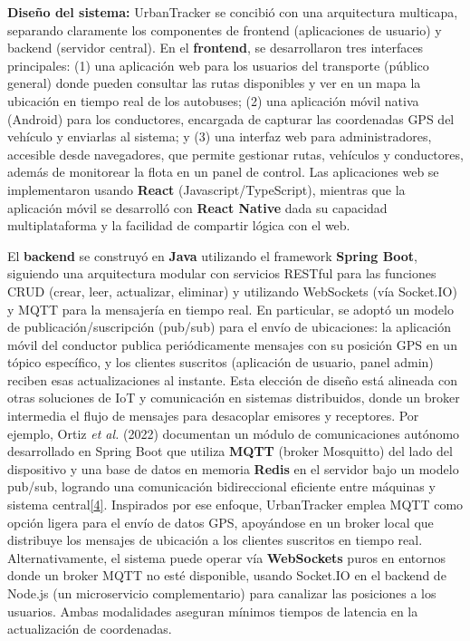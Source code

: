 \textbf{Diseño del sistema:} UrbanTracker se concibió con una arquitectura multicapa, separando claramente los componentes de frontend (aplicaciones de usuario) y backend (servidor central). En el \textbf{frontend}, se desarrollaron tres interfaces principales: (1) una aplicación web para los usuarios del transporte (público general) donde pueden consultar las rutas disponibles y ver en un mapa la ubicación en tiempo real de los autobuses; (2) una aplicación móvil nativa (Android) para los conductores, encargada de capturar las coordenadas GPS del vehículo y enviarlas al sistema; y (3) una interfaz web para administradores, accesible desde navegadores, que permite gestionar rutas, vehículos y conductores, además de monitorear la flota en un panel de control. Las aplicaciones web se implementaron usando \textbf{React} (Javascript/TypeScript), mientras que la aplicación móvil se desarrolló con \textbf{React Native} dada su capacidad multiplataforma y la facilidad de compartir lógica con el web.

El \textbf{backend} se construyó en \textbf{Java} utilizando el framework \textbf{Spring Boot}, siguiendo una arquitectura modular con servicios RESTful para las funciones CRUD (crear, leer, actualizar, eliminar) y utilizando WebSockets (vía Socket.IO) y MQTT para la mensajería en tiempo real. En particular, se adoptó un modelo de publicación/suscripción (pub/sub) para el envío de ubicaciones: la aplicación móvil del conductor publica periódicamente mensajes con su posición GPS en un tópico específico, y los clientes suscritos (aplicación de usuario, panel admin) reciben esas actualizaciones al instante. Esta elección de diseño está alineada con otras soluciones de IoT y comunicación en sistemas distribuidos, donde un broker intermedia el flujo de mensajes para desacoplar emisores y receptores. Por ejemplo, Ortiz \emph{et al.} (2022) documentan un módulo de comunicaciones autónomo desarrollado en Spring Boot que utiliza \textbf{MQTT} (broker Mosquitto) del lado del dispositivo y una base de datos en memoria \textbf{Redis} en el servidor bajo un modelo pub/sub, logrando una comunicación bidireccional eficiente entre máquinas y sistema central\href{https://bibliotecadigital.udea.edu.co/entities/publication/3eb20d8e-dece-489f-8bcc-89f009b482cf\#:~:text=entre\%20las\%20m\%C3\%A1quinas\%20y\%20el,logrando\%20as\%C3\%AD\%20una\%20comunicaci\%C3\%B3n\%20bidireccional}{{[}4{]}}. Inspirados por ese enfoque, UrbanTracker emplea MQTT como opción ligera para el envío de datos GPS, apoyándose en un broker local que distribuye los mensajes de ubicación a los clientes suscritos en tiempo real. Alternativamente, el sistema puede operar vía \textbf{WebSockets} puros en entornos donde un broker MQTT no esté disponible, usando Socket.IO en el backend de Node.js (un microservicio complementario) para canalizar las posiciones a los usuarios. Ambas modalidades aseguran mínimos tiempos de latencia en la actualización de coordenadas.

